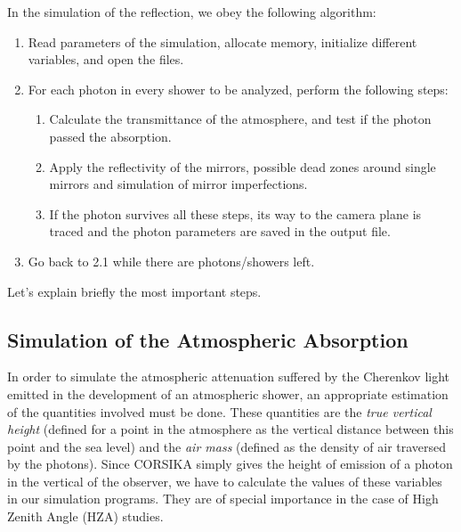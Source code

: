 \simprocessfig
%
In the simulation of the reflection, we obey the following algorithm:
%
\begin{enumerate}[1.]
  
\item Read parameters of the simulation, allocate memory, initialize
  different variables, and open the files.

\item For each \Cherenkov photon in every shower to be analyzed,
  perform the following steps:
  
  \begin{enumerate}[\theenumi.1.]
  \item Calculate the transmittance of the atmosphere, and test
    if the photon passed the absorption.
    
  \item Apply the reflectivity of the mirrors, possible dead zones
    around single mirrors and simulation of mirror imperfections.
    
  \item If the photon survives all these steps, its way to the camera
    plane is traced and the photon parameters are saved in the output
    file.
  \end{enumerate}

\item Go back to 2.1 while there are photons/showers left.

\end{enumerate}

Let's explain briefly the most important steps.

\subsection{Simulation of the Atmospheric Absorption}

In order to simulate the atmospheric attenuation suffered by the
Cherenkov light emitted in the development of an atmospheric shower,
an appropriate estimation of the quantities involved must be done.
These quantities are the \emph{true vertical height} (defined for a
point in the atmosphere as the vertical distance between this point
and the sea level) and the \emph{air mass} (defined as the density of
air traversed by the photons). Since CORSIKA simply gives the height
of emission of a photon in the vertical of the observer, we have to
calculate the values of these variables in our simulation programs.
They are of special importance in the case of High Zenith Angle (HZA)
studies.

